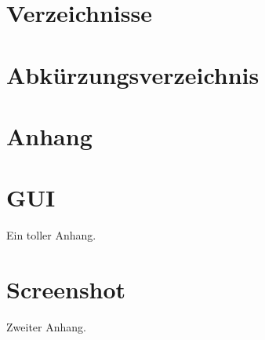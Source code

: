 \documentclass[12pt,a4paper, listof=entryprefix, bibliography=totocnumbered,toc=listofnumbered,footsepline]{scrartcl}
\newcounter{verzeichnis}
\begin{document}
\pagebreak


	 \label{Verzeichnisse}
	\renewcommand{\thesection}{\Roman{verzeichnis}}
	\section*{Verzeichnisse}
	\renewcommand{\refname}{Literaturverzeichnis}
	\printbibliography
	\pagebreak
	
	\listoffigures
	\pagebreak
	
	\listoftables
	\pagebreak
	
	\section{Abkürzungsverzeichnis}
	\vspace{-6em} %
	\printnoidxglossary[type=\acronymtype,style=alttree,title=,toctitle=] %
	\newpage

\setcounter{page}{1}  %
\begin{appendix}
	 \label{Anhang}
	\section*{Anhang} %
	\renewcommand{\thesection}{\Roman{section}}
	
	\setcounter{section}{0} %
	\section{GUI}
	\label{app:gui}
	Ein toller Anhang.
	
	\section{Screenshot}
	\label{app:screenshot}
	Zweiter Anhang.
\end{appendix}
\end{document}
